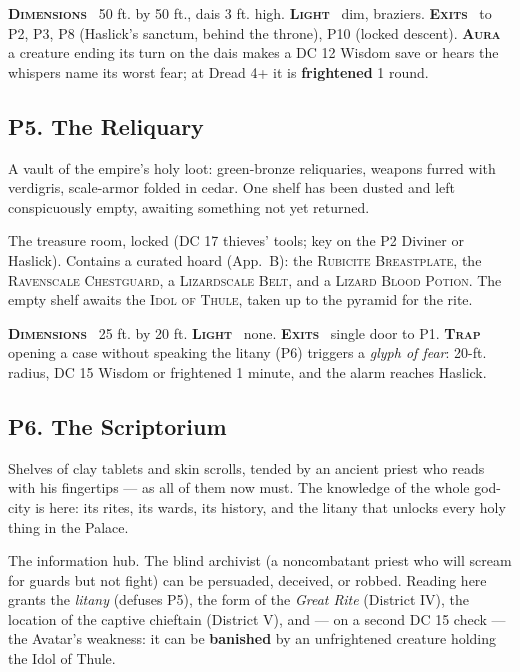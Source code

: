 \documentclass[10pt,twoside]{article}
\newcommand{\tech}[1]{\textbf{\scshape\textcolor{stone}{#1}}\ }
\newcommand{\eqname}[1]{\textsc{#1}}
\begin{document}
\begin{techbox}
\tech{Dimensions} 50 ft. by 50 ft., dais 3 ft. high. \tech{Light} dim, braziers.
\tech{Exits} to P2, P3, P8 (Haslick's sanctum, behind the throne), P10 (locked
descent). \tech{Aura} a creature ending its turn on the dais makes a DC 12 Wisdom
save or hears the whispers name its worst fear; at Dread 4+ it is \textbf{frightened}
1 round.
\end{techbox}

\subsection{P5. The Reliquary}
\begin{readaloud}
A vault of the empire's holy loot: green-bronze reliquaries, weapons furred with
verdigris, scale-armor folded in cedar. One shelf has been dusted and left
conspicuously empty, awaiting something not yet returned.
\end{readaloud}
The treasure room, locked (DC 17 thieves' tools; key on the P2 Diviner or Haslick).
Contains a curated hoard (App.\ B): the \eqname{Rubicite Breastplate}, the
\eqname{Ravenscale Chestguard}, a \eqname{Lizardscale Belt}, and a \eqname{Lizard
Blood Potion}. The empty shelf awaits the \eqname{Idol of Thule}, taken up to the
pyramid for the rite.

\begin{techbox}
\tech{Dimensions} 25 ft. by 20 ft. \tech{Light} none. \tech{Exits} single door to P1.
\tech{Trap} opening a case without speaking the litany (P6) triggers a \emph{glyph of
fear}: 20-ft. radius, DC 15 Wisdom or frightened 1 minute, and the alarm reaches
Haslick.
\end{techbox}

\subsection{P6. The Scriptorium}
\begin{readaloud}
Shelves of clay tablets and skin scrolls, tended by an ancient priest who reads with
his fingertips --- as all of them now must. The knowledge of the whole god-city is
here: its rites, its wards, its history, and the litany that unlocks every holy
thing in the Palace.
\end{readaloud}
The information hub. The blind archivist (a noncombatant priest who will scream for
guards but not fight) can be persuaded, deceived, or robbed. Reading here grants the
\emph{litany} (defuses P5), the form of the \emph{Great Rite} (District IV), the
location of the captive chieftain (District V), and --- on a second DC 15 check ---
the Avatar's weakness: it can be \textbf{banished} by an unfrightened creature holding
the Idol of Thule.
\end{document}
